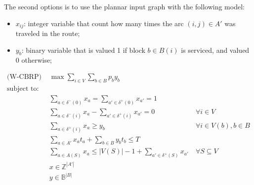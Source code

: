 The second options is to use the plannar input graph with the following model:

\begin{itemize}
  \item $x_{ij}$: integer variable that count how many times the arc $(i, j) \in A'$ was traveled in the route;
  \item $y_{b}$: binary variable that is valued 1 if block $b \in B(i)$ is serviced, and valued 0 otherwise; 
\end{itemize}

\begin{align}
  \text{(W-CBRP) } & \max \sum_{i \in V} \sum_{b \in B} p_b y_{b} & \label{eq:of}\\
  \nonumber \text{subject to:} & & \\
       & \sum_{a \in \delta^{-}(0)} x_{a} = \sum_{a' \in \delta^{+}(0)} x_{a'} = 1 & \label{eq:s-t-all} \\
       & \sum_{a \in \delta^{-}(i)} x_{a} - \sum_{a' \in \delta^{+}(i)} x_{a'} = 0 & \ \forall i \in V \label{eq:flow-conservation} \\
       & \sum_{a \in \delta^{+}(i)} x_{a} \geq y_{b} & \ \forall i \in V(b), b \in B \label{eq:in-path} \\
       & \sum_{a \in A'} x_{a}t_{a} + \sum_{b \in B} y_{b}t_{b} \leq T & \label{eq:max-time} \\
       & \sum_{a \in A(S)} x_{a} \leq |V(S)| - 1 + \sum_{a' \in \delta^{+}(S)} x_{a'} & \ \forall S \subseteq V \label{eq:new-walk-subtour-elimination} \\
       & x \in \mathbb{Z}^{|A'|} & \label{eq:dom-x} \\
       & y \in \mathbb{B}^{|B|} & \label{eq:dom-y}
\end{align}

